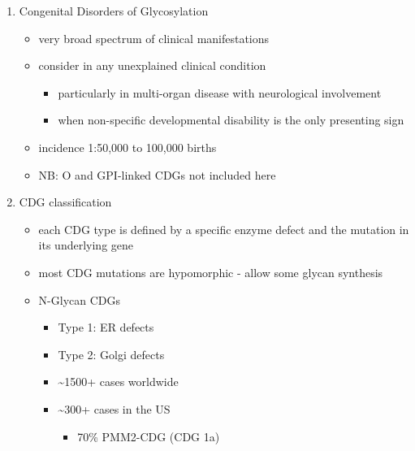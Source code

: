 \documentclass{scrartcl}
\begin{document}
\begin{enumerate}
\item Congenital Disorders of Glycosylation
\label{sec:orgbab18b3}
\begin{itemize}
\item very broad spectrum of clinical manifestations
\item consider in any unexplained clinical condition
\begin{itemize}
\item particularly in multi-organ disease with neurological involvement
\item when non-specific developmental disability is the only presenting sign
\end{itemize}
\item incidence 1:50,000 to 100,000 births
\item NB: O and GPI-linked CDGs not included here
\end{itemize}
\item CDG classification
\label{sec:org4c55db2}
\begin{itemize}
\item each CDG type is defined by a specific enzyme defect and the mutation in its underlying gene
\item most CDG mutations are hypomorphic - allow some glycan synthesis
\item N-Glycan CDGs
\begin{itemize}
\item Type 1: ER defects
\item Type 2: Golgi defects
\item \textasciitilde{}1500+ cases worldwide
\item \textasciitilde{}300+ cases in the US
\begin{itemize}
\item 70\% PMM2-CDG (CDG 1a)
\end{itemize}
\end{itemize}
\end{itemize}
\end{enumerate}
\end{document}
